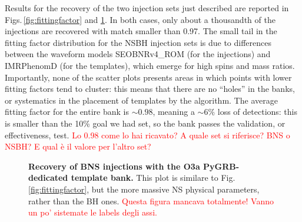 \documentclass[binding=0.6cm, LaM]{sapthesis}
\newcommand{\fpg}[1]{\textcolor{red}{#1} }
\begin{document}
        Results for the recovery of the two injection sets just described are reported in Figs.\,\ref{fig:fittingfactor} and \ref{fig:fittingfactorBNS}.  In both cases, only about a thousandth of the injections are recovered with match smaller than 0.97.  The small tail in the fitting factor distribution for the NSBH injection sets is due to differences between the waveform models {\ttfamily SEOBNRv4\_ROM} (for the injections) and {\ttfamily IMRPhenomD} (for the templates), which emerge for high spins and mass ratios.  Importantly, none of the scatter plots presents areas in which points with lower fitting factors tend to cluster:
        this means that there are no ``holes'' in the banks, or systematics in the placement of templates by the algorithm.
	The average fitting factor for the entire bank is $\sim0.98$, meaning a $\sim 6\%$ loss of detections: this is smaller than the 10\% goal we had set, so the bank passes the validation, or effectiveness, test.  \fpg{Lo 0.98 come lo hai ricavato? A quale set si riferisce? BNS o NSBH?  E qual \`e il valore per l'altro set?}

        \begin{figure}[!t]
          \noindent
          \centering
          \caption{{\bf Recovery of BNS injections with the O3a {\ttfamily PyGRB}-dedicated template bank.}  This plot is similare to Fig.\,\ref{fig:fittingfactor}, but the more massive NS physical parameters, rather than the BH ones.  \fpg{Questa figura mancava totalmente! Vanno un po' sistemate le labels degli assi.}}
          \label{fig:fittingfactorBNS}
        \end{figure}
\end{document}
